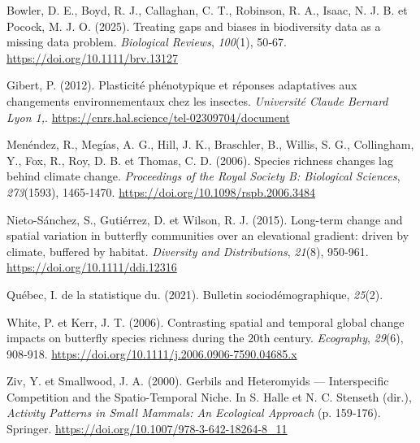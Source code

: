 \documentclass[9pt,twocolumn,twoside,]{pnas-new}
\newlength{\cslhangindent}
\newenvironment{CSLReferences}[2] %
 {\begin{list}{}{%
  \setlength{\itemindent}{0pt}
  \setlength{\leftmargin}{0pt}
  \setlength{\parsep}{0pt}
  \ifodd #1
   \setlength{\leftmargin}{\cslhangindent}
   \setlength{\itemindent}{-1\cslhangindent}
  \fi
  \setlength{\itemsep}{#2\baselineskip}}}
 {\end{list}}
\begin{document}
\label{refs}
\begin{CSLReferences}{1}{0}
Bowler, D. E., Boyd, R. J., Callaghan, C. T., Robinson, R. A., Isaac, N.
J. B. et Pocock, M. J. O. (2025). Treating gaps and biases in
biodiversity data as a missing data problem. \emph{Biological Reviews},
\emph{100}(1), 50‑67. \url{https://doi.org/10.1111/brv.13127}

Gibert, P. (2012). Plasticité phénotypique et réponses adaptatives aux
changements environnementaux chez les insectes. \emph{Université Claude
Bernard Lyon 1,}. \url{https://cnrs.hal.science/tel-02309704/document}

Menéndez, R., Megías, A. G., Hill, J. K., Braschler, B., Willis, S. G.,
Collingham, Y., Fox, R., Roy, D. B. et Thomas, C. D. (2006). Species
richness changes lag behind climate change. \emph{Proceedings of the
Royal Society B: Biological Sciences}, \emph{273}(1593), 1465‑1470.
\url{https://doi.org/10.1098/rspb.2006.3484}

Nieto-Sánchez, S., Gutiérrez, D. et Wilson, R. J. (2015). Long-term
change and spatial variation in butterfly communities over an
elevational gradient: driven by climate, buffered by habitat.
\emph{Diversity and Distributions}, \emph{21}(8), 950‑961.
\url{https://doi.org/10.1111/ddi.12316}

Québec, I. de la statistique du. (2021). Bulletin sociodémographique,
\emph{25}(2).

White, P. et Kerr, J. T. (2006). Contrasting spatial and temporal global
change impacts on butterfly species richness during the 20th century.
\emph{Ecography}, \emph{29}(6), 908‑918.
\url{https://doi.org/10.1111/j.2006.0906-7590.04685.x}

Ziv, Y. et Smallwood, J. A. (2000). Gerbils and {Heteromyids} ---
{Interspecific} {Competition} and the {Spatio}-{Temporal} {Niche}. In S.
Halle et N. C. Stenseth (dir.), \emph{Activity {Patterns} in {Small}
{Mammals}: {An} {Ecological} {Approach}} (p. 159‑176). Springer.
\url{https://doi.org/10.1007/978-3-642-18264-8_11}

\end{CSLReferences}



% 
\end{document}
